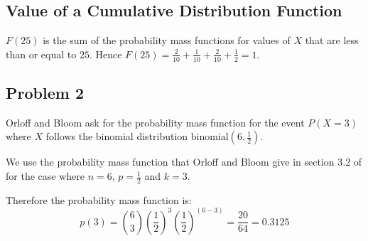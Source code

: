 \documentclass[a4paper,11pt]{article}
\begin{document}
\subsection{Value of a Cumulative Distribution Function}

$ F \left( 25 \right)$ is the sum of the probability mass functions
for values of $X$ that are less than or equal to $25$.  Hence 
$ F \left( 25 \right) = \frac{2}{10} + \frac{1}{10} + \frac{2}{10}  
 + \frac{1}{2} = 1$.

\subsection{Problem 2}

Orloff and Bloom ask for the probability mass function for the
event $P\left (X = 3 \right)$ where $X$ follows the binomial
distribution $\text{binomial} \left( 6, \frac{1}{2} \right)$.

We use the probability mass function that Orloff and Bloom give in
section 3.2 of \cite{reading4} for the case where $n = 6$, 
$p = \frac{1}{2}$ and $k=3$.

Therefore the probability mass function is:
\begin{equation}
  p \left( 3 \right) = \binom{6}{3} \left(\frac{1}{2} \right) ^ {3}
    \left( \frac{1}{2} \right) ^ {\left( 6-3 \right)} = \frac{20}{64} 
    = 0.3125
\end{equation}


\printbibliography{}
\end{document}
